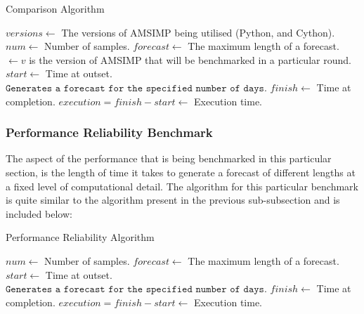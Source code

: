 \begin{algorithm}[H]
    \caption{Comparison Algorithm}
    \begin{algorithmic}[1]
        \State $versions \gets $ The versions of AMSIMP being utilised (Python, and Cython).
        \State $num \gets $ Number of samples.
        \State $forecast \gets $ The maximum length of a forecast.
             $\gets v$ is the version of AMSIMP that will be benchmarked in a particular round. 
                        \State $start \gets$ Time at outset.
                        \State $\texttt{Generates a forecast for the specified number of days.}$
                        \State $finish \gets$ Time at completion. 
                        \State $execution = finish - start \gets $ Execution time.
                    \EndIf
                \EndWhile
            \EndFor
        \EndFunction
    \end{algorithmic}
\end{algorithm}

\subsubsection{Performance Reliability Benchmark}
The aspect of the performance that is being benchmarked in this particular section, is the length of time it takes to generate a forecast of different lengths at a fixed level of computational detail. The algorithm for this particular benchmark is quite similar to the algorithm present in the previous sub-subsection and is included below:

\begin{algorithm}[H]
    \caption{Performance Reliability Algorithm}
    \begin{algorithmic}[1]
        \State $num \gets $ Number of samples.
        \State $forecast \gets $ The maximum length of a forecast.
                    \State $start \gets$ Time at outset.
                    \State $\texttt{Generates a forecast for the specified number of days.}$
                    \State $finish \gets$ Time at completion. 
                    \State $execution = finish - start \gets $ Execution time.
                \EndIf
            \EndWhile
        \EndFunction
    \end{algorithmic}
\end{algorithm}

